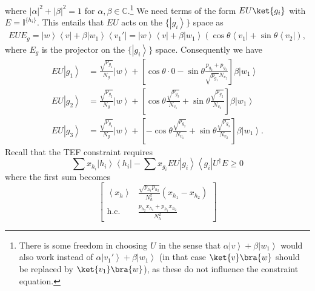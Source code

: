 \documentclass{theoretics}
\begin{document}
where $\left|\alpha\right|^{2}+\left|\beta\right|^{2}=1$ for $\alpha,\beta\in\mathbb{C}$.\footnote{There is some freedom in choosing $U$ in the sense that $\alpha\left|v\right\rangle +\beta\left|w_{1}\right\rangle $ would also work instead of $\alpha\left|v_1'\right\rangle +\beta\left|w_{1}\right\rangle$ (in that case $\ket{v}\bra{w}$ should be replaced by $\ket{v_1}\bra{w}$), as these do not influence the constraint equation.} %
We need terms of the form $EU\ket{g_i}$ with $E=\mathbb{I}^{\{h_i\}}$. This entails that $EU$ acts on the $\{\left|g_{i}\right\rangle \}$
space as
\begin{align*}
  EUE_{g}  =\left|w\right\rangle \left\langle v\right|+\beta\left|w_{1}\right\rangle \left\langle v_{1}'\right| =\left|w\right\rangle \left\langle v\right|+\beta\left|w_{1}\right\rangle \left(\cos\theta\left\langle v_{1}\right|+\sin\theta\left\langle v_{2}\right|\right),
\end{align*}
where $E_g$ is the projector on the $\{\left|g_{i}\right\rangle \}$ space.
Consequently we have
\begin{align*}
  EU\left|g_{1}\right\rangle & =\frac{\sqrt{p_{g_{1}}}}{N_{g}}\left|w\right\rangle +\left[\cos\theta\cdot 0-\sin\theta\frac{p_{g_{2}}+p_{g_{3}}}{\sqrt{p_{g_{1}}}N_{v_{2}}}\right]\beta\left|w_{1}\right\rangle            \\
  EU\left|g_{2}\right\rangle & =\frac{\sqrt{p_{g_{2}}}}{N_{g}}\left|w\right\rangle +\left[\cos\theta\frac{\sqrt{p_{g_{3}}}}{N_{v_{1}}}+\sin\theta\frac{\sqrt{p_{g_{2}}}}{N_{v_{2}}}\right]\beta\left|w_{1}\right\rangle    \\
  EU\left|g_{3}\right\rangle & =\frac{\sqrt{p_{g_{3}}}}{N_{g}}\left|w\right\rangle +\left[-\cos\theta\frac{\sqrt{p_{g_{2}}}}{N_{v_{1}}}+\sin\theta\frac{\sqrt{p_{g_{3}}}}{N_{v_{2}}}\right]\beta\left|w_{1}\right\rangle .
\end{align*}
Recall that the TEF constraint requires
\begin{displaymath}
  \sum x_{h_{i}}\left|h_{i}\right\rangle \left\langle h_{i}\right|-\sum x_{g_{i}}EU\left|g_{i}\right\rangle \left\langle g_{i}\right|U^{\dagger}E\ge0
\end{displaymath}
where the first sum becomes
\begin{displaymath}
  \left[\begin{array}{cc}
      \left\langle x_{h}\right\rangle & \frac{\sqrt{p_{h_{1}}p_{h_{2}}}}{N_{h}^{2}}(x_{h_{1}}-x_{h_{2}}) \\
      \text{h.c.}                     & \frac{p_{h_{2}}x_{h_{1}}+p_{h_{1}}x_{h_{2}}}{N_{h}^{2}}
    \end{array}\right]
\end{displaymath}
\end{document}
